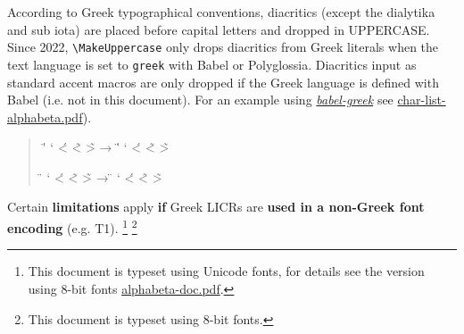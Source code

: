 \documentclass[a4paper]{scrartcl}
\newcommand{\cs}[1]{\texttt{\textbackslash#1}}
\newcommand{\pkgref}[1]{\emph{\href{https://ctan.org/pkg/#1}{#1}}}
\begin{document}
According to Greek typographical conventions, diacritics (except the
dialytika and sub iota) are placed before capital letters and
dropped in UPPERCASE.
Since 2022, \cs{MakeUppercase} only drops diacritics from Greek literals
when the text language is set to \texttt{greek} with Babel or Polyglossia.
Diacritics input as standard accent macros are only dropped if the Greek
language is defined with Babel (i.e. not in this document).
For an example using \pkgref{babel-greek} see
\href{char-list-alphabeta.pdf}{char-list-alphabeta.pdf}).
%
\begin{quote}
  \greekscript
  \newcommand{\sample}{\<{\alpha} \>{\epsilon} \"'{\iota} \>`{\eta}
                       \'<{\omicron} \~<{\upsilon} \~>{\omega}}
  \sample{} →   \MakeUppercase{\sample}

  \renewcommand{\sample}{\<{\Alpha} \>{\Epsilon} \"{\Iota} \>`{\Eta}
                         \'<{\Omicron} \~<{\Upsilon} \~>{\Omega}}
  \sample{} →   \MakeUppercase{\sample}
\end{quote}
%
Certain \textbf{limitations} apply \textbf{if} Greek LICRs are
\textbf{used in a non-Greek font encoding} (e.g. T1).%
\ifdefined \UnicodeEncodingName
  \footnote{This document is typeset using Unicode fonts,
  	    for details see the version using 8-bit fonts
	    \href{alphabeta-doc.pdf}{alphabeta-doc.pdf}.}
\else
  \footnote{This document is typeset using  8-bit fonts.}
\end{document}
